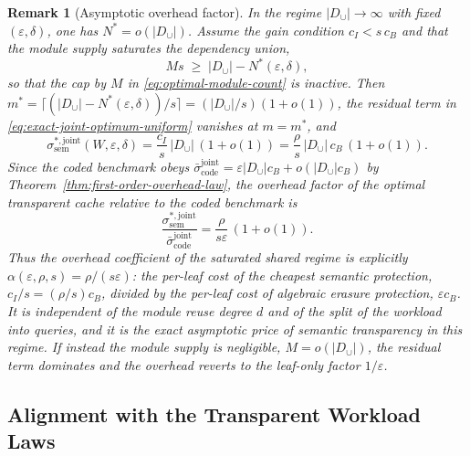 \documentclass[journal]{IEEEtran}
\newtheorem{remark}{Remark}[section]
\numberwithin{equation}{section}
\begin{document}
\begin{remark}[Asymptotic overhead factor]
\label{rem:asymptotic-overhead-alpha}
In the regime \(|D_{\cup}|\to\infty\) with fixed \((\varepsilon,\delta)\),
one has \(N^*=o(|D_{\cup}|)\).  Assume the gain condition \(c_I<s\,c_B\)
and that the module supply \emph{saturates} the dependency union,
\[
  Ms\;\ge\;|D_{\cup}|-N^*(\varepsilon,\delta),
\]
so that the cap by \(M\) in \eqref{eq:optimal-module-count} is inactive.
Then \(m^*=\lceil(|D_{\cup}|-N^*(\varepsilon,\delta))/s\rceil
=(|D_{\cup}|/s)(1+o(1))\),
the residual term in \eqref{eq:exact-joint-optimum-uniform} vanishes at
\(m=m^*\), and
\begin{equation}
  \sigma_{\mathrm{sem}}^{*,\mathrm{joint}}(W,\varepsilon,\delta)
  =
  \frac{c_I}{s}\,|D_{\cup}|\,(1+o(1))
  =
  \frac{\rho}{s}\,|D_{\cup}|\,c_B\,(1+o(1)).
\label{eq:asymptotic-alpha}
\end{equation}
Since the coded benchmark obeys
\(\bar\sigma_{\mathrm{code}}^{\mathrm{joint}}
=\varepsilon|D_{\cup}|c_B+o(|D_{\cup}|c_B)\) by
Theorem~\ref{thm:first-order-overhead-law}, the overhead factor of the
optimal transparent cache relative to the coded benchmark is
\begin{equation}
  \frac{\sigma_{\mathrm{sem}}^{*,\mathrm{joint}}}
       {\bar\sigma_{\mathrm{code}}^{\mathrm{joint}}}
  =
  \frac{\rho}{s\varepsilon}\,(1+o(1)).
\label{eq:alpha-factor}
\end{equation}
Thus the overhead coefficient of the saturated shared regime is explicitly
\(\alpha(\varepsilon,\rho,s)=\rho/(s\varepsilon)\): the per-leaf cost of
the cheapest semantic protection, \(c_I/s=(\rho/s)c_B\), divided by the
per-leaf cost of algebraic erasure protection, \(\varepsilon c_B\).  It is
independent of the module reuse degree \(d\) and of the split of the
workload into queries, and it is the exact asymptotic price of semantic
transparency in this regime.  If instead the module supply is negligible,
\(M=o(|D_{\cup}|)\), the residual term dominates and the overhead reverts
to the leaf-only factor \(1/\varepsilon\).
\end{remark}

\subsection{Alignment with the Transparent Workload Laws}
\label{subsec:coded-vs-transparent-comparison}
\end{document}
